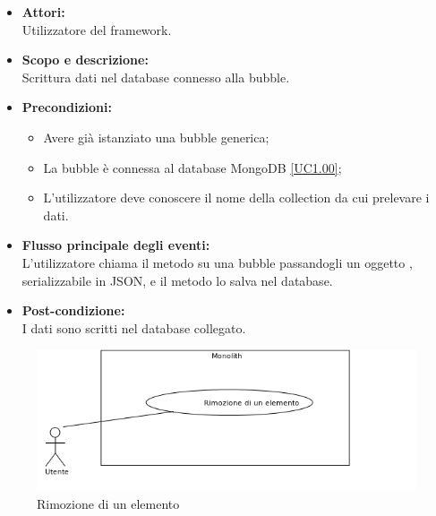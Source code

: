 \begin{itemize}
\item \textbf{Attori:}
\\Utilizzatore del framework.
\item \textbf{Scopo e descrizione:} 
\\Scrittura dati nel database connesso alla bubble.
\item \textbf{Precondizioni:}
\begin{itemize}
	\item Avere già istanziato una bubble generica;
	\item La bubble è connessa al database MongoDB \ref{UC1.00};
	\item L'utilizzatore deve conoscere il nome della collection da cui prelevare i dati.
\end{itemize}
\item \textbf{Flusso principale degli eventi:}
\\L'utilizzatore chiama il metodo su una bubble passandogli un oggetto , serializzabile in JSON, e il metodo lo salva nel database.
\item \textbf{Post-condizione:}
\\I dati sono scritti nel database collegato.
\end{itemize}


\begin{figure}[H]
	\centering
	\includegraphics[width=15cm]{../../documenti/AnalisiDeiRequisiti/Diagrammi_img/uc1_03.png}
	\caption{\UCCCaption{} Rimozione di un elemento}
\end{figure}

